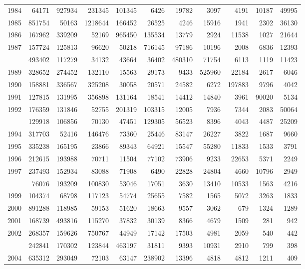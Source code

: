 \documentclass[
]{article}
\begin{document}
\begin{longtable}[t]{lrrrrrrrrrr}
1984 & 64171 & 927934 & 231345 & 101345 & 6426 & 19782 & 3097 & 4191 & 10187 & 49995\\
1985 & 851754 & 50163 & 1218644 & 166452 & 26525 & 4246 & 15916 & 1941 & 2302 & 36130\\
1986 & 167962 & 339209 & 52169 & 965450 & 135534 & 13779 & 2924 & 11538 & 1027 & 21644\\
1987 & 157724 & 125813 & 96620 & 50218 & 716145 & 97186 & 10196 & 2008 & 6836 & 12393\\
\addlinespace
1988 & 493402 & 117279 & 34132 & 43664 & 36402 & 480310 & 71754 & 6113 & 1119 & 11423\\
1989 & 328652 & 274452 & 132110 & 15563 & 29173 & 9433 & 525960 & 22184 & 2617 & 6046\\
1990 & 158881 & 336567 & 325208 & 30058 & 20571 & 24582 & 6272 & 197883 & 9796 & 4042\\
1991 & 127815 & 131995 & 356898 & 131164 & 18541 & 14412 & 14840 & 3961 & 90020 & 5134\\
1992 & 176359 & 131846 & 52755 & 201319 & 103315 & 12005 & 7936 & 7344 & 2083 & 50064\\
\addlinespace
1993 & 129918 & 106856 & 70130 & 47451 & 129305 & 56523 & 8396 & 4043 & 4487 & 25209\\
1994 & 317703 & 52416 & 146476 & 73360 & 25446 & 83147 & 26227 & 3822 & 1687 & 9660\\
1995 & 335238 & 165195 & 23866 & 89343 & 64921 & 15547 & 55280 & 11833 & 1533 & 3791\\
1996 & 212615 & 193988 & 70711 & 11504 & 77102 & 73906 & 9233 & 22653 & 5371 & 2249\\
1997 & 237493 & 152934 & 83088 & 71908 & 6490 & 22828 & 24804 & 4660 & 10796 & 2949\\
\addlinespace
1998 & 76076 & 193209 & 100830 & 53046 & 17051 & 3630 & 13410 & 10533 & 1563 & 4216\\
1999 & 104374 & 68798 & 117123 & 54774 & 25655 & 7582 & 1565 & 5072 & 3263 & 1833\\
2000 & 891288 & 118985 & 59153 & 51620 & 18663 & 9557 & 3062 & 679 & 1324 & 1289\\
2001 & 168739 & 493816 & 115270 & 37832 & 30139 & 8366 & 4679 & 1509 & 281 & 942\\
2002 & 268357 & 159626 & 750767 & 44949 & 17142 & 17503 & 4981 & 2059 & 540 & 442\\
\addlinespace
2003 & 242841 & 170302 & 123844 & 463197 & 31811 & 9393 & 10931 & 2910 & 799 & 398\\
2004 & 635312 & 293049 & 72103 & 63147 & 238902 & 13396 & 4818 & 4812 & 1211 & 409\\

\end{longtable}
\end{document}
